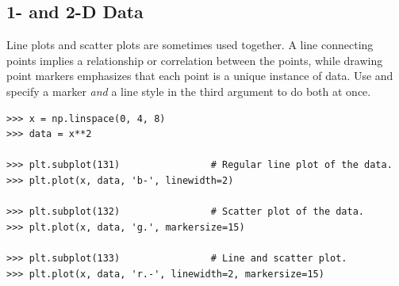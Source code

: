 %

\subsection*{1- and 2-D Data} %

Line plots and scatter plots are sometimes used together.
A line connecting points implies a relationship or correlation between the points, while drawing point markers emphasizes that each point is a unique instance of data.
Use  and specify a marker \emph{and} a line style in the third argument to do both at once.

\begin{lstlisting}
>>> x = np.linspace(0, 4, 8)
>>> data = x**2

>>> plt.subplot(131)                # Regular line plot of the data.
>>> plt.plot(x, data, 'b-', linewidth=2)

>>> plt.subplot(132)                # Scatter plot of the data.
>>> plt.plot(x, data, 'g.', markersize=15)

>>> plt.subplot(133)                # Line and scatter plot.
>>> plt.plot(x, data, 'r.-', linewidth=2, markersize=15)
\end{lstlisting}


